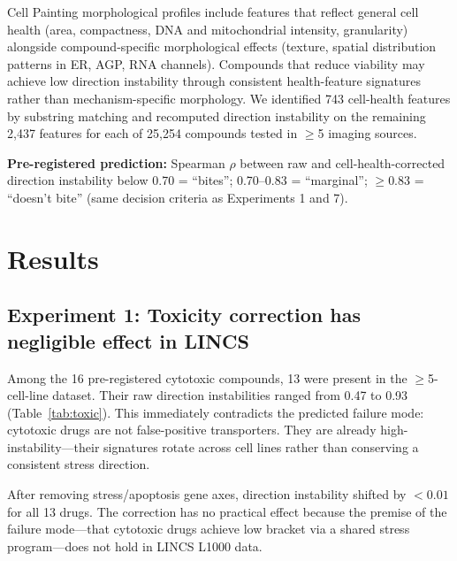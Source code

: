 \documentclass{article}
\begin{document}
Cell Painting morphological profiles include features that reflect general
cell health (area, compactness, DNA and mitochondrial intensity, granularity)
alongside compound-specific morphological effects (texture, spatial
distribution patterns in ER, AGP, RNA channels). Compounds that reduce
viability may achieve low direction instability through consistent
health-feature signatures rather than mechanism-specific morphology. We
identified 743 cell-health features by substring matching and recomputed
direction instability on the remaining 2{,}437 features for each of 25{,}254
compounds tested in $\geq$5 imaging sources.

\textbf{Pre-registered prediction:} Spearman $\rho$ between raw and
cell-health-corrected direction instability below 0.70 = ``bites'';
0.70--0.83 = ``marginal''; $\geq 0.83$ = ``doesn't bite'' (same decision
criteria as Experiments 1 and 7).

\section{Results}

\subsection{Experiment 1: Toxicity correction has negligible effect in LINCS}

Among the 16 pre-registered cytotoxic compounds, 13 were present in the
$\geq$5-cell-line dataset. Their raw direction instabilities ranged from
0.47 to 0.93 (Table~\ref{tab:toxic}). This immediately contradicts the
predicted failure mode: cytotoxic drugs are not false-positive transporters.
They are already high-instability---their signatures rotate across cell lines
rather than conserving a consistent stress direction.

After removing stress/apoptosis gene axes, direction instability shifted by
$<0.01$ for all 13 drugs. The correction has no practical effect because the
premise of the failure mode---that cytotoxic drugs achieve low bracket via
a shared stress program---does not hold in LINCS L1000 data.
\end{document}
